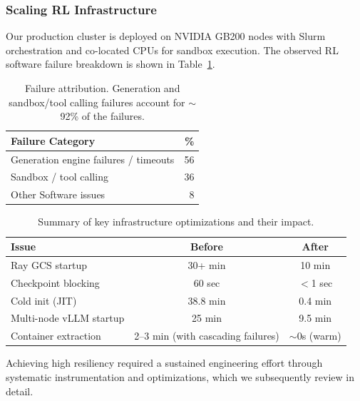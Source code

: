 \subsubsection{Scaling RL Infrastructure}
\noindent Our production cluster is deployed on NVIDIA GB200 nodes with Slurm orchestration and co-located CPUs for sandbox execution. The observed RL software failure breakdown is shown in Table~\ref{tab:failure-attribution}.
\begin{table}[!ht]
\centering
\begin{tabular}{lr}
\hline
\textbf{Failure Category} & \textbf{\%} \\
\hline
Generation engine failures / timeouts & 56 \\
Sandbox / tool calling & 36 \\
Other Software issues & 8 \\
\hline
\end{tabular}
\caption{Failure attribution. Generation and sandbox/tool calling failures account for $\sim$92\% of the failures.}
\label{tab:failure-attribution}
\end{table}

\begin{table}[!ht]
\centering
\begin{tabular}{lcc}
\toprule
\textbf{Issue} & \textbf{Before} & \textbf{After} \\
\midrule
Ray GCS startup           & 30+ min          & 10 min \\
Checkpoint blocking       & 60 sec              & {$<$1 sec} \\
Cold init (JIT)           & 38.8 min         & 0.4 min \\
Multi-node vLLM startup   & 25 min           & 9.5 min \\
Container extraction      & 2--3 min (with cascading failures) & $\sim$0s (warm) \\
\bottomrule
\end{tabular}
\caption{Summary of key infrastructure optimizations and their impact.}
\label{tab:improvements}
\end{table}

Achieving high resiliency required a sustained engineering effort through systematic instrumentation and optimizations, which we subsequently review in detail. 

